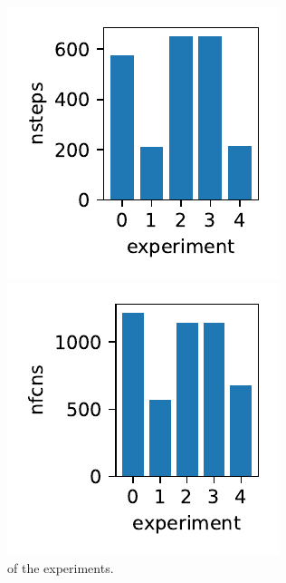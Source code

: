 \documentclass{report}
\begin{document}
\begin{figure}[h]
\centering
\begin{minipage}[t]{0.3\textwidth}
\centering
\includegraphics[width=\textwidth]{../Plots/Project2_main/Figure_700}
\caption{ of the experiments.}
\label{pl:nsteps_indx1}
\end{minipage}
\hfill
\begin{minipage}[t]{0.3\textwidth}
\centering
\includegraphics[width=\textwidth]{../Plots/Project2_main/Figure_701}

\end{minipage}
\end{figure}
\end{document}
